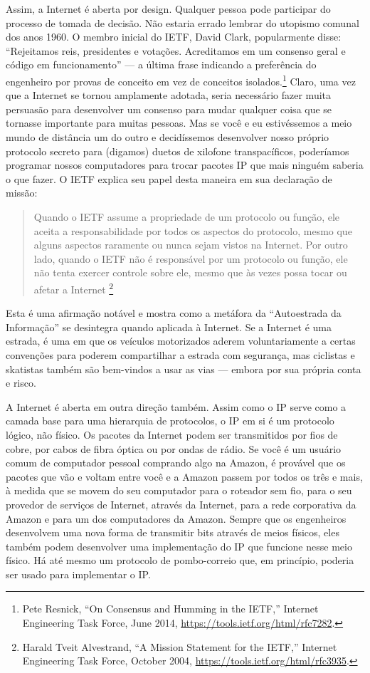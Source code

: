 Assim, a Internet é aberta por design. Qualquer pessoa pode participar do processo de tomada
de decisão. Não estaria errado lembrar do utopismo comunal dos anos 1960. O membro inicial
do IETF, David Clark, popularmente disse: ``Rejeitamos reis, presidentes e votações.
Acreditamos em um consenso geral e código em funcionamento'' --- a última frase indicando a
preferência do engenheiro por provas de conceito em vez de conceitos isolados.\footnote{Pete
Resnick, ``On Consensus and Humming in the IETF,'' Internet Engineering Task Force, June 2014,
\url{https://tools.ietf.org/html/rfc7282}.} Claro, uma vez que a Internet se tornou amplamente
adotada, seria necessário fazer muita persuasão para desenvolver um consenso para mudar
qualquer coisa que se tornasse importante para muitas pessoas. Mas se você e eu estivéssemos
a meio mundo de distância um do outro e decidíssemos desenvolver nosso próprio protocolo
secreto para (digamos) duetos de xilofone transpacíficos, poderíamos programar nossos
computadores para trocar pacotes IP que mais ninguém saberia o que fazer. O IETF explica seu
papel desta maneira em sua declaração de missão:

\begin{quote}
Quando o IETF assume a propriedade de um protocolo ou função, ele aceita a responsabilidade
por todos os aspectos do protocolo, mesmo que alguns aspectos raramente ou nunca sejam vistos
na Internet. Por outro lado, quando o IETF não é responsável por um protocolo ou função, ele
não tenta exercer controle sobre ele, mesmo que às vezes possa tocar ou afetar a Internet
\footnote{Harald Tveit Alvestrand, ``A Mission Statement for the IETF,'' Internet Engineering
Task Force, October 2004, \url{https://tools.ietf.org/html/rfc3935}.}
\end{quote}

Esta é uma afirmação notável e mostra como a metáfora da ``Autoestrada da Informação'' se
desintegra quando aplicada à Internet. Se a Internet é uma estrada, é uma em que os veículos
motorizados aderem voluntariamente a certas convenções para poderem compartilhar a estrada com
segurança, mas ciclistas e skatistas também são bem-vindos a usar as vias --- embora por sua
própria conta e risco.

A Internet é aberta em outra direção também. Assim como o IP serve como a camada base para
uma hierarquia de protocolos, o IP em si é um protocolo lógico, não físico. Os pacotes da
Internet podem ser transmitidos por fios de cobre, por cabos de fibra óptica ou por ondas
de rádio. Se você é um usuário comum de computador pessoal comprando algo na Amazon, é
provável que os pacotes que vão e voltam entre você e a Amazon passem por todos os três e
mais, à medida que se movem do seu computador para o roteador sem fio, para o seu provedor
de serviços de Internet, através da Internet, para a rede corporativa da Amazon e para um
dos computadores da Amazon. Sempre que os engenheiros desenvolvem uma nova forma de
transmitir bits através de meios físicos, eles também podem desenvolver uma implementação do
IP que funcione nesse meio físico. Há até mesmo um protocolo de pombo-correio que, em
princípio, poderia ser usado para implementar o IP.

